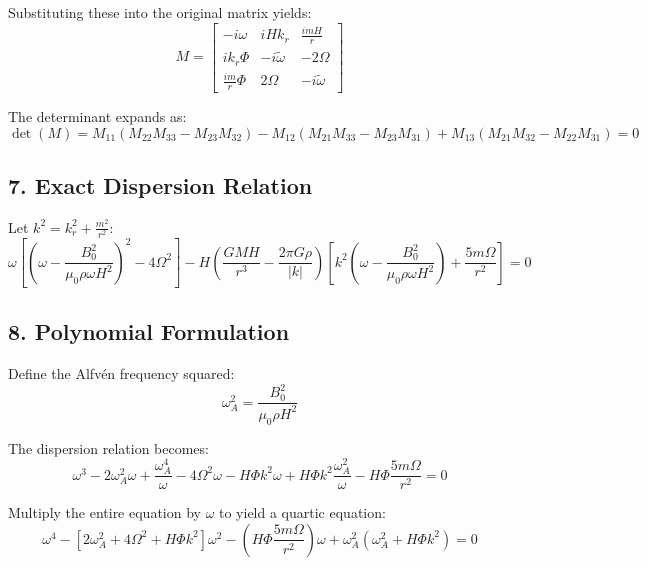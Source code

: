 \documentclass[11pt]{article}
\begin{document}
Substituting these into the original matrix yields:
\begin{equation}
M = \begin{bmatrix}
-i\omega & i H k_r & \frac{imH}{r} \\[8pt]
i k_r \Phi & -i\tilde{\omega} & -2\Omega \\[8pt]
\frac{im}{r} \Phi & 2\Omega & -i\tilde{\omega}
\end{bmatrix}
\end{equation}

The determinant expands as:
\begin{equation}
\det(M) = M_{11}(M_{22}M_{33} - M_{23}M_{32}) - M_{12}(M_{21}M_{33} - M_{23}M_{31}) + M_{13}(M_{21}M_{32} - M_{22}M_{31}) = 0
\end{equation}

\subsection*{7. Exact Dispersion Relation} Let $k^2 = k_r^2 + \frac{m^2}{r^2}$:
\begin{equation}
\omega \left[ \left( \omega - \frac{B_0^2}{\mu_0 \rho \omega H^2} \right)^2 - 4\Omega^2 \right] - H \left( \frac{GM H}{r^3} - \frac{2\pi G \rho}{|k|} \right) \left[ k^2 \left( \omega - \frac{B_0^2}{\mu_0 \rho \omega H^2} \right) + \frac{5m\Omega}{r^2} \right] = 0
\end{equation}

\subsection*{8. Polynomial Formulation}
Define the Alfvén frequency squared:
\begin{equation}
\omega_A^2 = \frac{B_0^2}{\mu_0 \rho H^2}
\end{equation}

The dispersion relation becomes:
\begin{equation}
\omega^3 - 2\omega_A^2\omega + \frac{\omega_A^4}{\omega} - 4\Omega^2\omega - H\Phi k^2 \omega + H\Phi k^2 \frac{\omega_A^2}{\omega} - H\Phi\frac{5m\Omega}{r^2} = 0
\end{equation}

Multiply the entire equation by $\omega$ to yield a quartic equation:
\begin{equation}
\omega^4 - \left[ 2\omega_A^2 + 4\Omega^2 + H\Phi k^2 \right] \omega^2 - \left( H\Phi\frac{5m\Omega}{r^2} \right) \omega + \omega_A^2 \left( \omega_A^2 + H\Phi k^2 \right) = 0
\end{equation}
\end{document}
